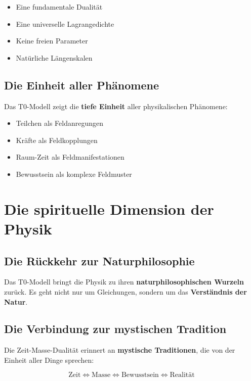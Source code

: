 \documentclass[12pt,a4paper]{report}
\begin{document}
	\begin{itemize}
		\item Eine fundamentale Dualität
		\item Eine universelle Lagrangedichte
		\item Keine freien Parameter
		\item Natürliche Längenskalen
	\end{itemize}
	
	\subsection{Die Einheit aller Phänomene}
	
	Das T0-Modell zeigt die \textbf{tiefe Einheit} aller physikalischen Phänomene:
	
	\begin{itemize}
		\item Teilchen als Feldanregungen
		\item Kräfte als Feldkopplungen
		\item Raum-Zeit als Feldmanifestationen
		\item Bewusstsein als komplexe Feldmuster
	\end{itemize}
	
	\section{Die spirituelle Dimension der Physik}
	
	\subsection{Die Rückkehr zur Naturphilosophie}
	
	Das T0-Modell bringt die Physik zu ihren \textbf{naturphilosophischen Wurzeln} zurück. Es geht nicht nur um Gleichungen, sondern um das \textbf{Verständnis der Natur}.
	
	\subsection{Die Verbindung zur mystischen Tradition}
	
	Die Zeit-Masse-Dualität erinnert an \textbf{mystische Traditionen}, die von der Einheit aller Dinge sprechen:
	
	\begin{equation}
		\text{Zeit} \Leftrightarrow \text{Masse} \Leftrightarrow \text{Bewusstsein} \Leftrightarrow \text{Realität}
	\end{equation}
	
\end{document}
